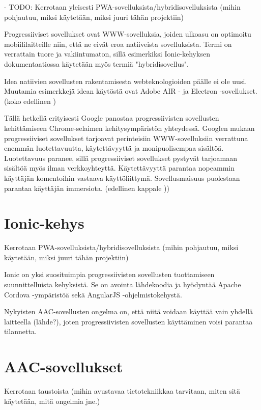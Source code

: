 \documentclass[utf8]{gradu3}
\begin{document}
- TODO: Kerrotaan yleisesti PWA-sovelluksista/hybridisovelluksista (mihin pohjautuu, miksi käytetään, miksi juuri tähän projektiin)

Progressiiviset sovellukset ovat WWW-sovelluksia, joiden ulkoasu on optimoitu mobiililaitteille niin, että ne eivät eroa natiiveista sovelluksista. Termi on verrattain tuore ja vakiintumaton, sillä esimerkiksi Ionic-kehyksen dokumentaatiossa käytetään myös termiä "hybridisovellus".

Idea natiivien sovellusten rakentamisesta webteknologioiden päälle ei ole uusi. Muutamia esimerkkejä idean käytöstä ovat Adobe AIR - ja Electron -sovellukset. (koko edellinen \parencite[]{escaping-tabs})

Tällä hetkellä erityisesti Google panostaa progressiivisten sovellusten kehittämiseen Chrome-selaimen kehitysympäristön yhteydessä. Googlen mukaan progressiiviset sovellukset tarjoavat perinteisiin WWW-sovelluksiin verrattuna enemmän luotettavuutta, käytettävyyttä ja monipuolisempaa sisältöä. Luotettavuus paranee, sillä progressiiviset sovellukset pystyvät tarjoamaan sisältöä myös ilman verkkoyhteyttä. Käytettävyyttä parantaa nopeammin käyttäjän komentoihin vastaava käyttöliittymä. Sovellusmaisuus puolestaan parantaa käyttäjän immersiota. (edellinen kappale \parencite[]{google-pwa-marketing}))

\section{Ionic-kehys}

Kerrotaan PWA-sovelluksista/hybridisovelluksista (mihin pohjautuu, miksi käytetään, miksi juuri tähän projektiin)

Ionic on yksi suosituimpia progressiivisten sovellusten tuottamiseen suunnittelluista kehyksistä. Se on avointa lähdekoodia ja hyödyntää Apache Cordova -ympäristöä sekä AngularJS -ohjelmistokehystä.

Nykyisten AAC-sovellusten ongelma on, että niitä voidaan käyttää vain yhdellä laitteella (lähde?), joten progressiivisten sovellusten käyttäminen voisi parantaa tilannetta.

\section{AAC-sovellukset}

Kerrotaan taustoista (mihin avustavaa tietotekniikkaa tarvitaan, miten sitä käytetään, mitä ongelmia jne.)
\end{document}
